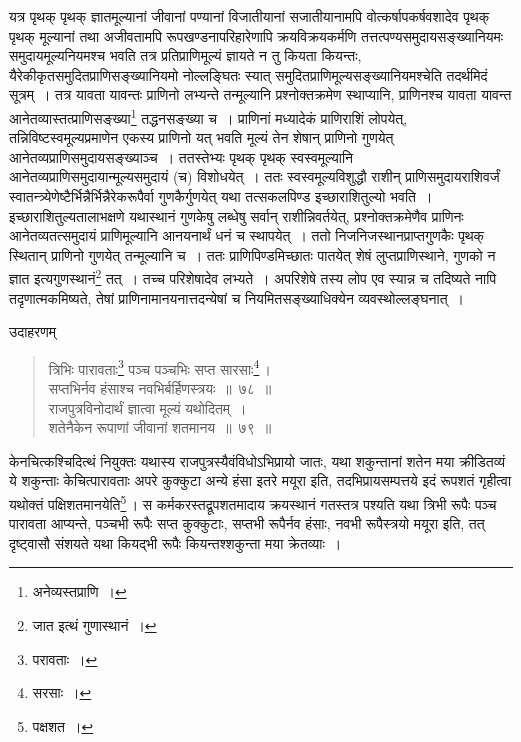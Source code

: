 \documentclass[10pt, openany]{book}
\begin{document}
{{{यत्र पृथक् पृथक् ज्ञातमूल्यानां जीवानां पण्यानां विजातीयानां
सजातीयानामपि}
{वोत्कर्षापकर्षवशादेव पृथक् पृथक् मूल्यानां तथा अजीवतामपि
रूपखण्डनापरिहारेणापि क्रयविक्रयकर्मणि तत्तत्पण्यसमुदायसङ्ख्यानियमः समुदायमूल्यनियमश्च भवति तत्र
प्रतिप्राणिमूल्यं ज्ञायते न तु कियता कियन्तः, यैरेकीकृतसमुदितप्राणिसङ्ख्यानियमो नोल्लङ्घितः स्यात्}
{समुदितप्राणिमूल्यसङ्ख्यानियमश्चेति तदर्थमिदं सूत्रम्~। तत्र यावता
यावन्तः प्राणिनो}
{लभ्यन्ते तन्मूल्यानि प्रश्नोक्तक्रमेण स्थाप्यानि, प्राणिनश्च यावता
यावन्त आनेतव्यास्तत्प्राणिसङ्ख्या\renewcommand{\thefootnote}{\s १}\footnote{\s अनेव्यस्तप्राणि~।}  तद्धनसङ्ख्या च~। प्राणिनां मध्यादेकं प्राणिराशिं लोपयेत्,
तन्निविष्टस्वमूल्यप्रमाणेन}
{एकस्य प्राणिनो यत् भवति मूल्यं तेन शेषान् प्राणिनो गुणयेत्
आनेतव्यप्राणिसमुदायसङ्ख्याञ्च~।}
{ततस्तेभ्यः पृथक् पृथक् स्वस्वमूल्यानि
आनेतव्यप्राणिसमुदायान्मूल्यसमुदायं (च) विशोधयेत्~।}
{ततः स्वस्वमूल्यविशुद्धौ राशीन् प्राणिसमुदायराशिवर्जं
स्वातन्त्र्येणेष्टैर्भिन्नैर्भिन्नैरेकरूपैर्वा}
{गुणकैर्गुणयेत् यथा तत्सकलपिण्ड इच्छाराशितुल्यो भवति~।
इच्छाराशितुल्यतालाभक्षणे}
{यथास्थानं गुणकेषु लब्धेषु सर्वान् राशीन्निवर्तयेत्, प्रश्नोक्तक्रमेणैव
प्राणिनः आनेतव्यतत्समुदायं}
{प्राणिमूल्यानि आनयनार्थं धनं च स्थापयेत्~। ततो निजनिजस्थानप्राप्तगुणकैः
पृथक् स्थितान्}
{प्राणिनो गुणयेत् तन्मूल्यानि च~। ततः प्राणिपिण्डमिच्छातः पातयेत् शेषं
लुप्तप्राणिस्थाने,}
{गुणको न ज्ञात इत्यगुणस्थानं\renewcommand{\thefootnote}{\s २}\footnote{\s जात इत्थं गुणास्थानं~।} तत्~। तच्च परिशेषादेव लभ्यते~।
अपरिशेषे तस्य लोप एव स्यान्न}
{च तदिष्यते नापि तदृणात्मकमिष्यते, तेषां प्राणिनामानयनात्तदन्येषां च
नियमितसङ्ख्याधिक्येन}
{व्यवस्थोल्लङ्घनात्~।}

\vspace{3mm}
{उदाहरणम्\textemdash}

\begin{quote}
    
 {\eg त्रिभिः पारावताः\renewcommand{\thefootnote}{\s ३}\footnote{\s परावताः~।}  पञ्च पञ्चभिः सप्त सारसाः\renewcommand{\thefootnote}{\s ४}\footnote{\s सरसाः~।}\,। \\
 सप्तभिर्नव हंसाश्च नवभिर्बर्हिणस्त्रयः~॥~७८~॥ \\
 राजपुत्रविनोदार्थं ज्ञात्वा मूल्यं यथोदितम्~। \\
 शतेनैकेन रूपाणां जीवानां शतमानय~॥~७९~॥}\end{quote}

{केनचित्कश्चिदित्थं नियुक्तः यथास्य राजपुत्रस्यैवंविधोऽभिप्रायो जातः,
यथा}
{शकुन्तानां शतेन मया क्रीडितव्यं ये शकुन्ताः केचित्पारावताः अपरे
कुक्कुटा अन्ये हंसा इतरे}
{मयूरा इति, तदभिप्रायसम्पत्तये इदं रूपशतं गृहीत्वा यथोक्तं
पक्षिशतमानयेति\renewcommand{\thefootnote}{\s ५}\footnote{\s पक्षशत~।}\,। स कर्मकरस्तद्रूपशतमादाय क्रयस्थानं गतस्तत्र पश्यति यथा त्रिभी रूपैः पञ्च पारावता
आप्यन्ते, पञ्चभी}
{रूपैः सप्त कुक्कुटाः, सप्तभी रूपैर्नव हंसाः, नवभी रूपैस्त्रयो मयूरा
इति, तत् दृष्ट्वासौ संशयते यथा कियद्भी रूपैः कियन्तश्शकुन्ता मया क्रेतव्याः~।}


}}
\end{document}

